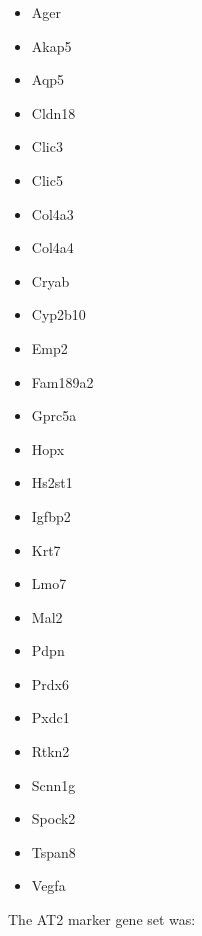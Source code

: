 \documentclass[aps,superscriptaddress, notitlepage,longbibliography]{revtex4-1}
\begin{document}
\begin{itemize}
    \item Ager
    \item Akap5
    \item Aqp5
    \item Cldn18
    \item Clic3
    \item Clic5
    \item Col4a3
    \item Col4a4
    \item Cryab
    \item Cyp2b10
    \item Emp2
    \item Fam189a2
    \item Gprc5a
    \item Hopx
    \item Hs2st1
    \item Igfbp2
    \item Krt7
    \item Lmo7
    \item Mal2
    \item Pdpn
    \item Prdx6
    \item Pxdc1
    \item Rtkn2
    \item Scnn1g
    \item Spock2
    \item Tspan8
    \item Vegfa
\end{itemize}

The AT2 marker gene set was:
\end{document}
